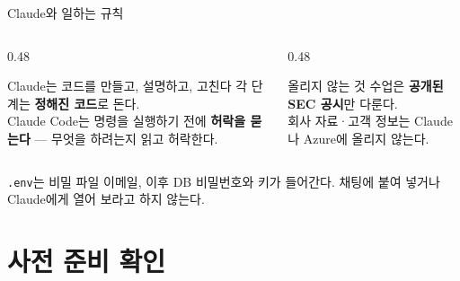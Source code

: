 \documentclass[aspectratio=169,10pt]{beamer}
\begin{document}
\begin{frame}{Claude와 일하는 규칙}
\begin{columns}[T]
\begin{column}{0.48\textwidth}
\begin{block}{Claude는 코드를 만들고, 설명하고, 고친다}
각 단계는 \textbf{정해진 코드}로 돈다.\\
Claude Code는 명령을 실행하기 전에 \textbf{허락을 묻는다} — 무엇을 하려는지 읽고 허락한다.
\end{block}
\end{column}
\begin{column}{0.48\textwidth}
\begin{alertblock}{올리지 않는 것}
수업은 \textbf{공개된 SEC 공시}만 다룬다.\\
회사 자료·고객 정보는 Claude나 Azure에 올리지 않는다.
\end{alertblock}
\end{column}
\end{columns}
\vspace{0.8em}
\begin{alertblock}{\texttt{.env}는 비밀 파일}
이메일, 이후 DB 비밀번호와 키가 들어간다. 채팅에 붙여 넣거나 Claude에게 열어 보라고 하지 않는다.\\
\end{alertblock}
\end{frame}

\section{사전 준비 확인}
\end{document}
